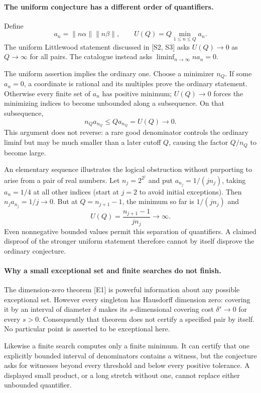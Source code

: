 \documentclass[11pt]{article}
\begin{document}
\paragraph{The uniform conjecture has a different order of quantifiers.}
Define
\[
 a_n=\|n\alpha\|\|n\beta\|,\qquad
 U(Q)=Q\min_{1\leq n\leq Q}a_n.
\]
The uniform Littlewood statement discussed in [S2, S3] asks
$U(Q)\to0$ as $Q\to\infty$ for all pairs. The catalogue instead asks
$\liminf_{n\to\infty}n a_n=0$.

The uniform assertion implies the ordinary one. Choose a minimizer $n_Q$.
If some $a_n=0$, a coordinate is rational and its multiples prove the
ordinary statement. Otherwise every finite set of $a_n$ has positive
minimum; $U(Q)\to0$ forces the minimizing indices to become unbounded
along a subsequence. On that subsequence,
\[
                     n_Qa_{n_Q}\leq Q a_{n_Q}=U(Q)\to0.
\]
This argument does not reverse: a rare good denominator controls the
ordinary liminf but may be much smaller than a later cutoff $Q$, causing
the factor $Q/n_Q$ to become large.

An elementary sequence illustrates the logical obstruction without
purporting to arise from a pair of real numbers. Let $n_j=2^{2^j}$ and
put $a_{n_j}=1/(j n_j)$, taking $a_n=1/4$ at all other indices (start
at $j=2$ to avoid initial exceptions). Then
$n_j a_{n_j}=1/j\to0$. But at $Q=n_{j+1}-1$, the minimum so far is
$1/(j n_j)$ and
\[
                    U(Q)=\frac{n_{j+1}-1}{j n_j}\to\infty.
                                                               \tag{95.7}
\]
Even nonnegative bounded values permit this separation of quantifiers.
A claimed disproof of the stronger uniform statement therefore cannot
by itself disprove the ordinary conjecture.

\paragraph{Why a small exceptional set and finite searches do not finish.}
The dimension-zero theorem [E1] is powerful information about any possible
exceptional set. However every singleton has Hausdorff dimension zero:
covering it by an interval of diameter $\delta$ makes its $s$-dimensional
covering cost $\delta^s\to0$ for every $s>0$. Consequently that theorem
does not certify a specified pair by itself. No particular point is
asserted to be exceptional here.

Likewise a finite search computes only a finite minimum. It can certify
that one explicitly bounded interval of denominators contains a witness,
but the conjecture asks for witnesses beyond every threshold and below
every positive tolerance. A displayed small product, or a long stretch
without one, cannot replace either unbounded quantifier.
\end{document}
